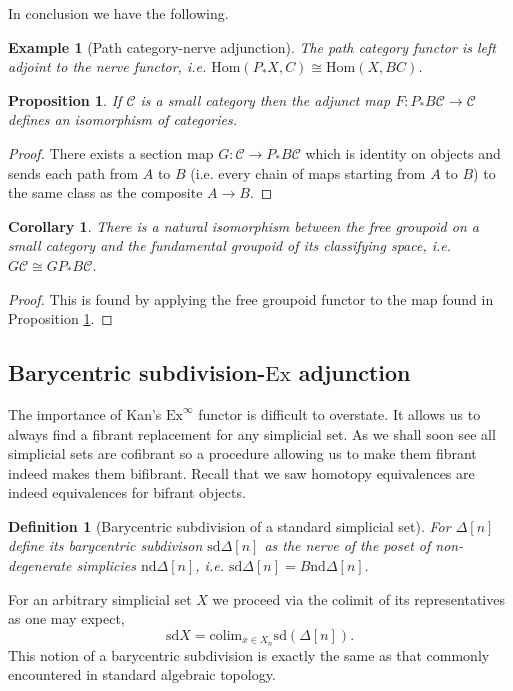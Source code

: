 \documentclass[12pt]{report}
\numberwithin{equation}{section}
\newcommand{\Hom}{{\mathrm{Hom}}}
\newtheorem{definition}[dummy]{Definition}
\newtheorem{corollary}[dummy]{Corollary}
\newtheorem{proposition}[dummy]{Proposition}
\newtheorem{example}[dummy]{Example}
\begin{document}
	In conclusion we have the following.
	\begin{example}[Path category-nerve adjunction]
		The path category functor is left adjoint to the nerve functor, i.e. \( \Hom(P_*X,C) \cong \Hom(X,BC) \).
	\end{example}
	\begin{proposition}\label{naturalisofundgrpd}
		If \( \mathcal{C} \) is a small category then the adjunct map \(F: P_*B \mathcal{C} \to \mathcal{C} \) defines an isomorphism of categories.
	\end{proposition}
	\begin{proof}
		There exists a section map \( G: \mathcal{C} \to P_*B\mathcal{C} \) which is identity on objects and sends each path from \( A\) to \( B \) (i.e. every chain of maps starting from \( A \) to \( B \)) to the same class as the composite \( A \to B \).
	\end{proof}
	\begin{corollary}\label{cor:freegrpdisofundgrpd}
		There is a natural isomorphism between the free groupoid on a small category and the fundamental groupoid of its classifying space, i.e. \( G\mathcal{C} \cong GP_* B\mathcal{C} \).
	\end{corollary}
	\begin{proof}
		This is found by applying the free groupoid functor to the map found in Proposition \ref{naturalisofundgrpd}.
	\end{proof}
	
	\subsection{Barycentric subdivision-\( \mathrm{Ex} \)  adjunction}
	The importance of Kan's \( \mathrm{Ex}^\infty \) functor is difficult to overstate. It allows us to always find a fibrant replacement for any simplicial set. As we shall soon see all simplicial sets are cofibrant so a procedure allowing us to make them fibrant indeed makes them bifibrant. Recall that we saw homotopy equivalences are indeed equivalences for bifrant objects.
	
	\begin{definition}[Barycentric subdivision of a standard simplicial set]
		For \( \Delta[n] \) define its barycentric subdivison \( \mathrm{sd}\Delta[n] \) as the nerve of the poset of non-degenerate simplicies \( \mathrm{nd}\Delta[n] \), i.e. \( \mathrm{sd} \Delta[n]=B \mathrm{nd}\Delta[n]. \) 
	\end{definition}
	For an arbitrary simplicial set \( X \) we proceed via the colimit of its representatives as one may expect, \[ \mathrm{sd}X = \mathrm{colim}_{x \in X_n} \mathrm{sd}(\Delta[n]) .\] This notion of a barycentric subdivision is exactly the same as that commonly encountered in standard algebraic topology.
	
\end{document}
